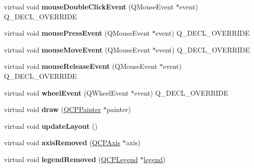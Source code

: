 \begin{DoxyCompactItemize}
\item 
virtual void {\bfseries mouse\+Double\+Click\+Event} (Q\+Mouse\+Event $\ast$event) Q\+\_\+\+D\+E\+C\+L\+\_\+\+O\+V\+E\+R\+R\+I\+DE\hypertarget{class_q_custom_plot_ad0be55c9ab8deb433e8f7522897d509e}{}\label{class_q_custom_plot_ad0be55c9ab8deb433e8f7522897d509e}

\item 
virtual void {\bfseries mouse\+Press\+Event} (Q\+Mouse\+Event $\ast$event) Q\+\_\+\+D\+E\+C\+L\+\_\+\+O\+V\+E\+R\+R\+I\+DE\hypertarget{class_q_custom_plot_a0fac62370735c4096d5cc57559420f4b}{}\label{class_q_custom_plot_a0fac62370735c4096d5cc57559420f4b}

\item 
virtual void {\bfseries mouse\+Move\+Event} (Q\+Mouse\+Event $\ast$event) Q\+\_\+\+D\+E\+C\+L\+\_\+\+O\+V\+E\+R\+R\+I\+DE\hypertarget{class_q_custom_plot_a01f74d8d344a6c6671550638345e7183}{}\label{class_q_custom_plot_a01f74d8d344a6c6671550638345e7183}

\item 
virtual void {\bfseries mouse\+Release\+Event} (Q\+Mouse\+Event $\ast$event) Q\+\_\+\+D\+E\+C\+L\+\_\+\+O\+V\+E\+R\+R\+I\+DE\hypertarget{class_q_custom_plot_a0fd1a6aa33fce10c15432deecae75233}{}\label{class_q_custom_plot_a0fd1a6aa33fce10c15432deecae75233}

\item 
virtual void {\bfseries wheel\+Event} (Q\+Wheel\+Event $\ast$event) Q\+\_\+\+D\+E\+C\+L\+\_\+\+O\+V\+E\+R\+R\+I\+DE\hypertarget{class_q_custom_plot_ac70648a6f405e37eaba7d244e0b3cfd1}{}\label{class_q_custom_plot_ac70648a6f405e37eaba7d244e0b3cfd1}

\item 
virtual void {\bfseries draw} (\hyperlink{class_q_c_p_painter}{Q\+C\+P\+Painter} $\ast$painter)\hypertarget{class_q_custom_plot_a8f21771005776857a1aaeb76a6d3db7e}{}\label{class_q_custom_plot_a8f21771005776857a1aaeb76a6d3db7e}

\item 
virtual void {\bfseries update\+Layout} ()\hypertarget{class_q_custom_plot_aeae5e068de2d4c8d19301571f1f0daef}{}\label{class_q_custom_plot_aeae5e068de2d4c8d19301571f1f0daef}

\item 
virtual void {\bfseries axis\+Removed} (\hyperlink{class_q_c_p_axis}{Q\+C\+P\+Axis} $\ast$axis)\hypertarget{class_q_custom_plot_aca64f782a4b96e12d77836c4a2650ad2}{}\label{class_q_custom_plot_aca64f782a4b96e12d77836c4a2650ad2}

\item 
virtual void {\bfseries legend\+Removed} (\hyperlink{class_q_c_p_legend}{Q\+C\+P\+Legend} $\ast$\hyperlink{class_q_custom_plot_a4eadcd237dc6a09938b68b16877fa6af}{legend})\hypertarget{class_q_custom_plot_a281221decdec4a6b5e958d40b77ccef7}{}\label{class_q_custom_plot_a281221decdec4a6b5e958d40b77ccef7}


\end{DoxyCompactItemize}
